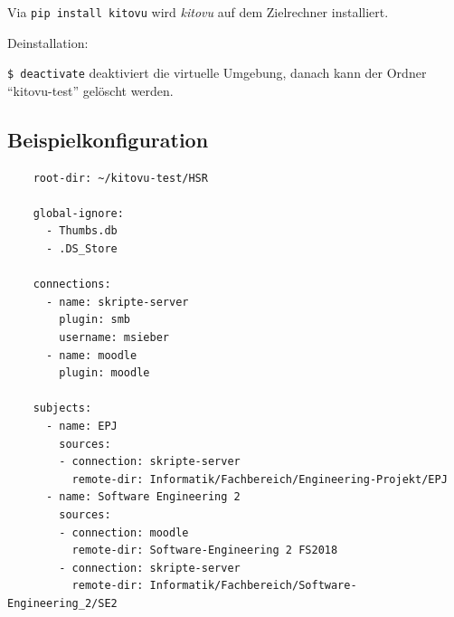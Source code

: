 \documentclass[a4paper]{article}
\begin{document}
Via \verb|pip install kitovu| wird \emph{kitovu} auf dem Zielrechner installiert.

Deinstallation: 

\verb|$ deactivate| deaktiviert die virtuelle Umgebung, danach kann der Ordner ``kitovu-test'' gelöscht werden.

\newpage

\subsection{Beispielkonfiguration}
	\begin{verbatim}
	root-dir: ~/kitovu-test/HSR
	
	global-ignore:
	  - Thumbs.db
	  - .DS_Store
	
	connections:
	  - name: skripte-server
	    plugin: smb
	    username: msieber
	  - name: moodle
	    plugin: moodle
	
	subjects:
	  - name: EPJ
	    sources:
	    - connection: skripte-server
	      remote-dir: Informatik/Fachbereich/Engineering-Projekt/EPJ
	  - name: Software Engineering 2
	    sources:
	    - connection: moodle
	      remote-dir: Software-Engineering 2 FS2018
	    - connection: skripte-server
	      remote-dir: Informatik/Fachbereich/Software-Engineering_2/SE2
	\end{verbatim}
\end{document}
